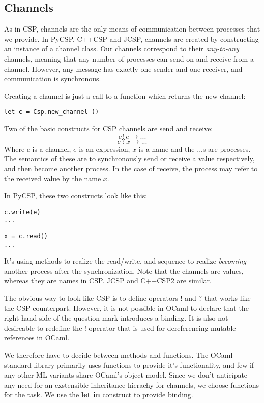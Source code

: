 \documentclass[a4paper,12pt]{article}
\begin{document}
\subsection{Channels}

As in CSP, channels are the only means of communication between processes that we provide.
In PyCSP, C++CSP and JCSP, channels are created by constructing an instance of a channel
class. Our channels correspond to their \emph{any-to-any} channels, meaning that any number
of processes can send on and receive from a channel. However, any message has exactly 
one sender and one receiver, and communication is synchronous.

Creating a channel is just a call to a function which returns the new channel:
\begin{verbatim}
let c = Csp.new_channel ()
\end{verbatim}

Two of the basic constructs for CSP channels are send and receive:
\[c\,!\,e \to ...\]
\[c\,?\,x \to ...\]
Where $c$ is a channel, $e$ is an expression, $x$ is a name and the $...$s are processes. 
The semantics of these are to synchronously send or receive a value respectively, and
then become another process. In the case of receive, the process may refer to the
received value by the name $x$.

In PyCSP, these two constructs look like this:
\begin{verbatim}
c.write(e)
...
\end{verbatim}
\begin{verbatim}
x = c.read()
...
\end{verbatim}
It's using methods to realize the read/write, and sequence to realize \emph{becoming}
another process after the synchronization. Note that the channels are values, whereas
they are names in CSP. JCSP and C++CSP2 are similar.

The obvious way to look like CSP is to define operators ! and ? that works like the
CSP counterpart. However, it is not possible in OCaml to declare that the right hand 
side of the question mark introduces a binding. It is also not desireable to redefine
the ! operator that is used for dereferencing mutable references in OCaml.

We therefore have to decide between methods and functions. The OCaml standard library
primarily uses functions to provide it's functionality, and few if any other ML 
variants share OCaml's object model. Since we don't anticipate any need for an
exstensible inheritance hierachy for channels, we choose functions for the task.
We use the \textbf{let in} construct to provide binding.
\end{document}
